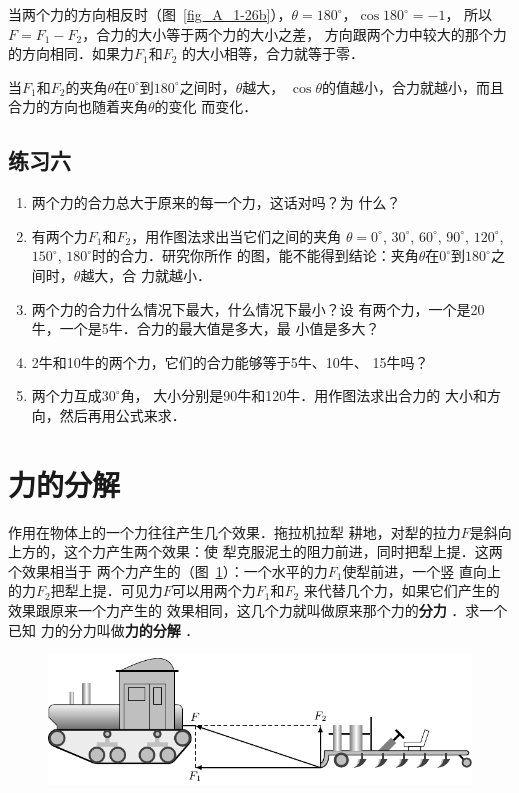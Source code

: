     当两个力的方向相反时（图~\ref{fig_A_1-26b}），$\theta =180^\circ$，$\cos 180^\circ=-1$，
所以$F=F_1-F_2$，合力的大小等于两个力的大小之差，
方向跟两个力中较大的那个力的方向相同．如果力$F_1$和$F_2$
的大小相等，合力就等于零．

    当$F_1$和$F_2$的夹角$\theta$在$0^\circ$到$180^\circ$之间时，$\theta$越大，
$\cos\theta$的值越小，合力就越小，而且合力的方向也随着夹角$\theta$的变化
而变化．


\subsection*{练习六} 
\begin{enumerate} 
\item 两个力的合力总大于原来的每一个力，这话对吗？为
什么？

\item 有两个力$F_1$和$F_2$，用作图法求出当它们之间的夹角
$\theta =0^\circ$, $30^\circ$, $60^\circ$, $90^\circ$, $120^\circ$, $150^\circ$, $180^\circ$时的合力．研究你所作
的图，能不能得到结论：夹角$\theta$在$0^\circ$到$180^\circ$之间时，$\theta $越大，合
力就越小．
\item 两个力的合力什么情况下最大，什么情况下最小？设
有两个力，一个是20牛，一个是5牛．合力的最大值是多大，最
小值是多大？
\item 2牛和10牛的两个力，它们的合力能够等于5牛、10牛、
15牛吗？
\item   两个力互成$30^\circ$角， 大小分别是90牛和120牛．用作图法求出合力的
大小和方向，然后再用公式来求．
\end{enumerate} 
    
\section{力的分解} 
作用在物体上的一个力往往产生几个效果．拖拉机拉犁
耕地，对犁的拉力$F$是斜向上方的，这个力产生两个效果：使
犁克服泥土的阻力前进，同时把犁上提．这两个效果相当于
两个力产生的（图~\ref{fig_A_1-27}）：一个水平的力$F_1$使犁前进，一个竖
直向上的力$F_2$把犁上提．可见力$F$可以用两个力$F_1$和$F_2$
来代替几个力，如果它们产生的效果跟原来一个力产生的
效果相同，这几个力就叫做原来那个力的\textbf{分力} ．求一个已知
力的分力叫做\textbf{力的分解} ．

\begin{figure} [htp]\centering
\includegraphics{fig/A/1-27.pdf} 
\caption{} \label{fig_A_1-27} 
\end{figure} 

